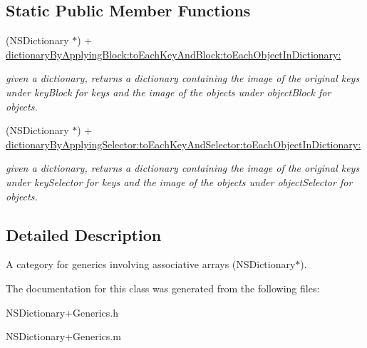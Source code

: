 \subsection*{Static Public Member Functions}
\begin{DoxyCompactItemize}
\item 
\hypertarget{interface_n_s_dictionary_07_generics_08_a1b7bb39cdcc53859fcdccdf02abe5b96}{(N\-S\-Dictionary $\ast$) + \hyperlink{interface_n_s_dictionary_07_generics_08_a1b7bb39cdcc53859fcdccdf02abe5b96}{dictionary\-By\-Applying\-Block\-:to\-Each\-Key\-And\-Block\-:to\-Each\-Object\-In\-Dictionary\-:}}\label{interface_n_s_dictionary_07_generics_08_a1b7bb39cdcc53859fcdccdf02abe5b96}

\begin{DoxyCompactList}\small\item\em given a dictionary, returns a dictionary containing the image of the original keys under key\-Block for keys and the image of the objects under object\-Block for objects. \end{DoxyCompactList}\item 
\hypertarget{interface_n_s_dictionary_07_generics_08_ae2508937f1402a06882d14292a086888}{(N\-S\-Dictionary $\ast$) + \hyperlink{interface_n_s_dictionary_07_generics_08_ae2508937f1402a06882d14292a086888}{dictionary\-By\-Applying\-Selector\-:to\-Each\-Key\-And\-Selector\-:to\-Each\-Object\-In\-Dictionary\-:}}\label{interface_n_s_dictionary_07_generics_08_ae2508937f1402a06882d14292a086888}

\begin{DoxyCompactList}\small\item\em given a dictionary, returns a dictionary containing the image of the original keys under key\-Selector for keys and the image of the objects under object\-Selector for objects. \end{DoxyCompactList}\end{DoxyCompactItemize}


\subsection{Detailed Description}
A category for generics involving associative arrays (N\-S\-Dictionary$\ast$). 

The documentation for this class was generated from the following files\-:\begin{DoxyCompactItemize}
\item 
N\-S\-Dictionary+\-Generics.\-h\item 
N\-S\-Dictionary+\-Generics.\-m\end{DoxyCompactItemize}
